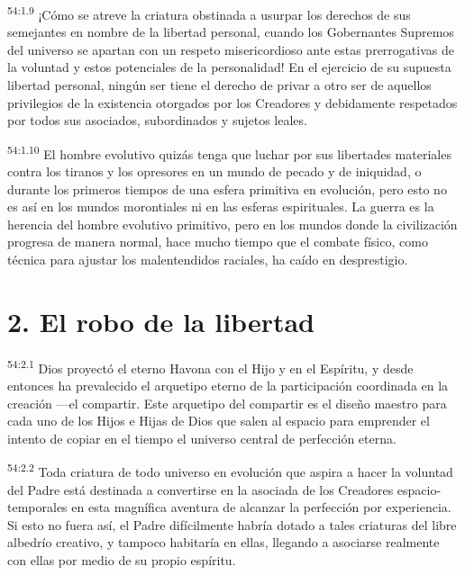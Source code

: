 \par
\textsuperscript{54:1.9} ¡Cómo se atreve la criatura obstinada a usurpar los derechos de sus semejantes en nombre de la libertad personal, cuando los Gobernantes Supremos del universo se apartan con un respeto misericordioso ante estas prerrogativas de la voluntad y estos potenciales de la personalidad! En el ejercicio de su supuesta libertad personal, ningún ser tiene el derecho de privar a otro ser de aquellos privilegios de la existencia otorgados por los Creadores y debidamente respetados por todos sus asociados, subordinados y sujetos leales.

\par
\textsuperscript{54:1.10} El hombre evolutivo quizás tenga que luchar por sus libertades materiales contra los tiranos y los opresores en un mundo de pecado y de iniquidad, o durante los primeros tiempos de una esfera primitiva en evolución, pero esto no es así en los mundos morontiales ni en las esferas espirituales. La guerra es la herencia del hombre evolutivo primitivo, pero en los mundos donde la civilización progresa de manera normal, hace mucho tiempo que el combate físico, como técnica para ajustar los malentendidos raciales, ha caído en desprestigio.

\section*{2. El robo de la libertad}
\par
\textsuperscript{54:2.1} Dios proyectó el eterno Havona con el Hijo y en el Espíritu, y desde entonces ha prevalecido el arquetipo eterno de la participación coordinada en la creación ---el compartir. Este arquetipo del compartir es el diseño maestro para cada uno de los Hijos e Hijas de Dios que salen al espacio para emprender el intento de copiar en el tiempo el universo central de perfección eterna.

\par
\textsuperscript{54:2.2} Toda criatura de todo universo en evolución que aspira a hacer la voluntad del Padre está destinada a convertirse en la asociada de los Creadores espacio-temporales en esta magnífica aventura de alcanzar la perfección por experiencia. Si esto no fuera así, el Padre difícilmente habría dotado a tales criaturas del libre albedrío creativo, y tampoco habitaría en ellas, llegando a asociarse realmente con ellas por medio de su propio espíritu.

